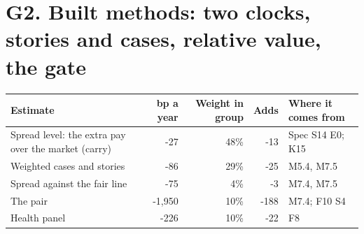 \documentclass[11pt,a4paper]{article}
\begin{document}
\section*{G2. Built methods: two clocks, stories and cases, relative value, the gate}
\par\noindent{}
\begin{center}\footnotesize\setlength{\tabcolsep}{3.5pt}\begin{tabular}{@{}p{6.2cm}rrrp{4.2cm}@{}}\toprule
Estimate & bp a year & Weight in group & Adds & Where it comes from \\\midrule
Spread level: the extra pay over the market (carry) & -27 & 48\% & -13 & Spec S14 E0; K15 \\
Weighted cases and stories & -86 & 29\% & -25 & M5.4, M7.5 \\
Spread against the fair line & -75 & 4\% & -3 & M7.4, M7.5 \\
The pair & -1,950 & 10\% & -188 & M7.4; F10 S4 \\
Health panel & -226 & 10\% & -22 & F8 \\
\bottomrule\end{tabular}\end{center}
\end{document}
